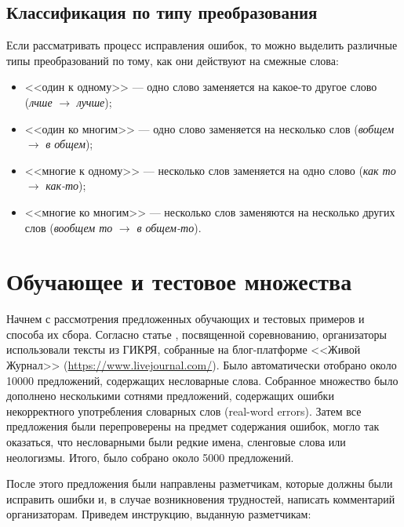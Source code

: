 \subsection{Классификация по типу преобразования}

Если рассматривать процесс исправления ошибок, то можно выделить различные типы преобразований по тому, как они действуют на смежные слова:
\begin{itemize}
	\item <<один к одному>> --- одно слово заменяется на какое-то другое слово (\textit{лчше} $\rightarrow$ \textit{лучше});
	\item <<один ко многим>> --- одно слово заменяется на несколько слов (\textit{вобщем} $\rightarrow$ \textit{в общем});
	\item <<многие к одному>> --- несколько слов заменяется на одно слово (\textit{как то} $\rightarrow$ \textit{как-то});
	\item <<многие ко многим>> --- несколько слов заменяются на несколько других слов (\textit{вообщем то} $\rightarrow$ \textit{в общем-то}).
\end{itemize}

\section{Обучающее и тестовое множества}

Начнем с рассмотрения предложенных обучающих и тестовых примеров и способа их сбора. Согласно статье \cite{Sorokin2016a}, посвященной соревнованию, организаторы использовали тексты из ГИКРЯ, собранные на блог-платформе <<Живой Журнал>> (\url{https://www.livejournal.com/}). Было автоматически отобрано около 10000 предложений, содержащих несловарные слова. Собранное множество было дополнено несколькими сотнями предложений, содержащих ошибки некорректного употребления словарных слов (real-word errors).  Затем все предложения были перепроверены на предмет содержания ошибок, могло так оказаться, что несловарными были редкие имена, сленговые слова или неологизмы. Итого, было собрано около 5000 предложений.

После этого предложения были направлены разметчикам, которые должны были исправить ошибки и, в случае возникновения трудностей, написать комментарий организаторам. Приведем инструкцию, выданную разметчикам:

